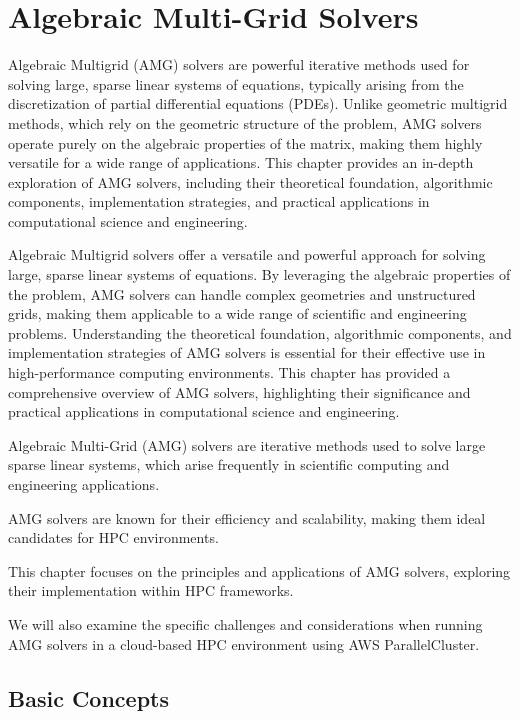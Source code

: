 

\chapter{Algebraic Multi-Grid Solvers}

Algebraic Multigrid (AMG) solvers are powerful iterative methods used for solving large, sparse linear systems of equations, typically arising from the discretization of partial differential equations (PDEs). Unlike geometric multigrid methods, which rely on the geometric structure of the problem, AMG solvers operate purely on the algebraic properties of the matrix, making them highly versatile for a wide range of applications. This chapter provides an in-depth exploration of AMG solvers, including their theoretical foundation, algorithmic components, implementation strategies, and practical applications in computational science and engineering.

Algebraic Multigrid solvers offer a versatile and powerful approach for solving large, sparse linear systems of equations. By leveraging the algebraic properties of the problem, AMG solvers can handle complex geometries and unstructured grids, making them applicable to a wide range of scientific and engineering problems. Understanding the theoretical foundation, algorithmic components, and implementation strategies of AMG solvers is essential for their effective use in high-performance computing environments. This chapter has provided a comprehensive overview of AMG solvers, highlighting their significance and practical applications in computational science and engineering.

Algebraic Multi-Grid (AMG) solvers are iterative methods used to solve large sparse linear systems, which arise frequently in scientific computing and engineering applications. 

AMG solvers are known for their efficiency and scalability, making them ideal candidates for HPC environments.

This chapter focuses on the principles and applications of AMG solvers, exploring their implementation within HPC frameworks. 

We will also examine the specific challenges and considerations when running AMG solvers in a cloud-based HPC environment using AWS ParallelCluster.

\section{Basic Concepts}

